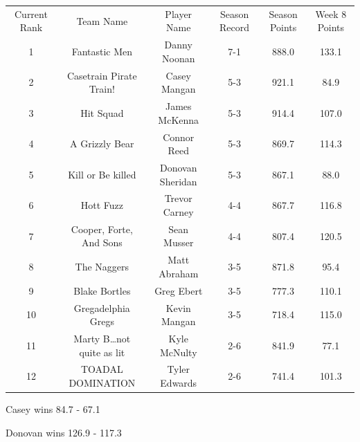 \documentclass[11pt,letterpaper]{article}
\begin{document}
\newpage
{}
\vspace{-25pt}
\begin{table} [h]
\footnotesize
\begin{center}
\begin{tabular} { c c c c c c }
\\[3mm] Current Rank & Team Name & Player Name & Season Record &  Season Points & Week 8 Points
\\[3mm] 1 & Fantastic Men & Danny Noonan & 7-1 & 888.0 & 133.1
\\ 2 & Casetrain Pirate Train! & Casey Mangan & 5-3 & 921.1 & 84.9
\\ 3 & Hit Squad & James McKenna & 5-3 & 914.4 & 107.0
\\ 4 & A Grizzly Bear & Connor Reed & 5-3 & 869.7 & 114.3
\\ 5 & Kill or Be killed & Donovan Sheridan & 5-3 & 867.1 & 88.0
\\ 6 & Hott Fuzz & Trevor Carney & 4-4 & 867.7 & 116.8
\\ 7 & Cooper, Forte, And Sons & Sean Musser & 4-4 & 807.4 & 120.5
\\ 8 & The Naggers & Matt Abraham & 3-5 & 871.8 & 95.4
\\ 9 & Blake Bortles & Greg Ebert & 3-5 & 777.3 & 110.1
\\ 10 & Gregadelphia Gregs & Kevin Mangan & 3-5 & 718.4 & 115.0
\\ 11 & Marty B\dots not quite as lit & Kyle McNulty & 2-6 & 841.9 & 77.1
\\ 12 & TOADAL DOMINATION & Tyler Edwards & 2-6 & 741.4 & 101.3
\end{tabular}
\end{center}
\end{table}




\newpage
{}



\par\noindent Casey wins 84.7 - 67.1
\bigskip
\par\noindent



{}
\par\noindent Donovan wins 126.9 - 117.3
\bigskip
\par\noindent
\end{document}
